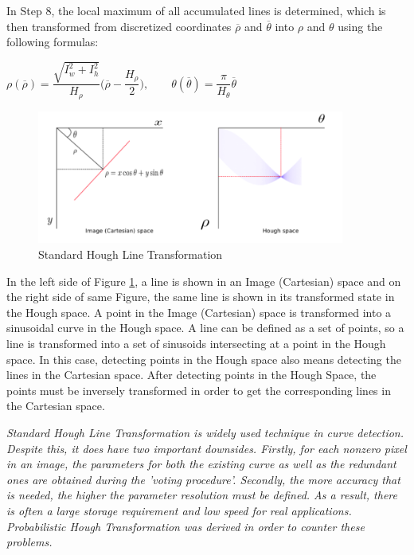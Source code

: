 In Step 8, the local maximum of all accumulated lines is determined, which is then transformed from discretized coordinates $\overline{\rho}$ and $\overline{\theta}$ into $\rho$ and $\theta$ using the following formulas:   
  
 \begin{center}

$ \rho(\overline{\rho}) = \dfrac{\sqrt{I^{2}_{w} + I^{2}_{h} }}{H_{\rho}} \bigg(\overline{\rho}-\dfrac{H_{\rho}}{2}\bigg)   ,  \qquad              \theta(\overline{\theta})=\dfrac{\pi}{H_{\theta}}\overline{\theta} $
 
 \end{center}
 
 \begin{figure}[H]
 \centering
  \includegraphics[width=0.9\textwidth]{./Bilder/Standard_Hough_Line_Transformation.png}
  \caption{Standard Hough Line Transformation\cite{Standard_Hough_Transformation}}
  \label{Standard_Hough_Line_Transformation_fig}
\end{figure}
 
 In the left side of Figure \ref{Standard_Hough_Line_Transformation_fig}, a line is shown in an Image (Cartesian) space and on the right side of same Figure, the same line is shown in its transformed state in the Hough space. A point in the Image (Cartesian) space is transformed into a sinusoidal curve in the Hough space. A line can be defined as a set of points, so a line is transformed into a set of sinusoids intersecting at a point in the Hough space. In this case, detecting points in the Hough space also means detecting the lines in the Cartesian space. After detecting points in the Hough Space, the points must be inversely transformed in order to get the corresponding lines in the Cartesian space.
 
\emph{\color{green}Standard Hough Line Transformation is widely used technique in curve detection. Despite this, it does have two important downsides. Firstly, for each nonzero pixel in an image, the parameters for both the existing curve as well as the redundant ones are obtained during the 'voting procedure'. Secondly, the more accuracy that is needed, the higher the parameter resolution must be defined. As a result, there is often a large storage requirement and low speed for real applications. Probabilistic Hough Transformation was derived in order to counter these problems. }


